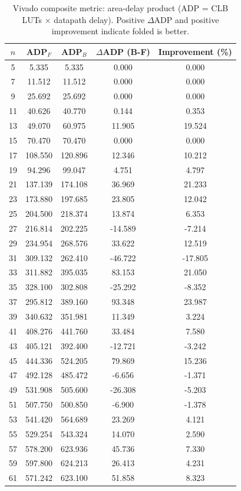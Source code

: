 \begin{table}[t]
\centering
\scriptsize
\setlength{\tabcolsep}{3.6pt}
\renewcommand{\arraystretch}{1.05}
\caption{Vivado composite metric: area-delay product (ADP = CLB LUTs $\times$ datapath delay). Positive $\Delta$ADP and positive improvement indicate folded is better.}
\label{tab:vivado_composite_adp}
\begin{tabular}{ccccc}
\hline
$n$ & ADP$_F$ & ADP$_B$ & $\Delta$ADP (B-F) & Improvement (\%) \\
\hline
5 & 5.335 & 5.335 & 0.000 & 0.000 \\
7 & 11.512 & 11.512 & 0.000 & 0.000 \\
9 & 25.692 & 25.692 & 0.000 & 0.000 \\
11 & 40.626 & 40.770 & 0.144 & 0.353 \\
13 & 49.070 & 60.975 & 11.905 & 19.524 \\
15 & 70.470 & 70.470 & 0.000 & 0.000 \\
17 & 108.550 & 120.896 & 12.346 & 10.212 \\
19 & 94.296 & 99.047 & 4.751 & 4.797 \\
21 & 137.139 & 174.108 & 36.969 & 21.233 \\
23 & 173.880 & 197.685 & 23.805 & 12.042 \\
25 & 204.500 & 218.374 & 13.874 & 6.353 \\
27 & 216.814 & 202.225 & -14.589 & -7.214 \\
29 & 234.954 & 268.576 & 33.622 & 12.519 \\
31 & 309.132 & 262.410 & -46.722 & -17.805 \\
33 & 311.882 & 395.035 & 83.153 & 21.050 \\
35 & 328.100 & 302.808 & -25.292 & -8.352 \\
37 & 295.812 & 389.160 & 93.348 & 23.987 \\
39 & 340.632 & 351.981 & 11.349 & 3.224 \\
41 & 408.276 & 441.760 & 33.484 & 7.580 \\
43 & 405.121 & 392.400 & -12.721 & -3.242 \\
45 & 444.336 & 524.205 & 79.869 & 15.236 \\
47 & 492.128 & 485.472 & -6.656 & -1.371 \\
49 & 531.908 & 505.600 & -26.308 & -5.203 \\
51 & 507.750 & 500.850 & -6.900 & -1.378 \\
53 & 541.420 & 564.689 & 23.269 & 4.121 \\
55 & 529.254 & 543.324 & 14.070 & 2.590 \\
57 & 578.200 & 623.936 & 45.736 & 7.330 \\
59 & 597.800 & 624.213 & 26.413 & 4.231 \\
61 & 571.242 & 623.100 & 51.858 & 8.323 \\
\hline
\end{tabular}
\end{table}
